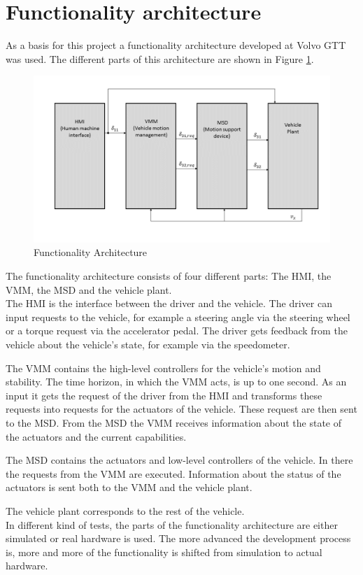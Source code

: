 \documentclass[ExampleMasters.tex]{subfiles}
\begin{document}
\section{Functionality architecture}
\label{sec:func_architecture}

As a basis for this project a functionality architecture developed at Volvo GTT was used. The different parts of this architecture are shown in Figure \ref{fig:funct_architecture}.

\begin{figure}[!htb]
	\centering
	\includegraphics[width=1\linewidth]{figures/functionality_architecture}
	
	\caption{Functionality Architecture}
	\label{fig:funct_architecture}
\end{figure}

The functionality architecture consists of four different parts: The \gls{HMI}, the \gls{VMM}, the \gls{MSD} and the vehicle plant.\\
The \gls{HMI} is the interface between the driver and the vehicle. The driver can input requests to the vehicle, for example a steering angle via the steering wheel or a torque request via the accelerator pedal. The driver gets feedback from the vehicle about the vehicle's state, for example via the speedometer.

The \gls{VMM} contains the high-level controllers for the vehicle's motion and stability. The time horizon, in which the \gls{VMM} acts, is up to one second. As an input it gets the request of the driver from the \gls{HMI} and transforms these requests into requests for the actuators of the vehicle. These request are then sent to the \gls{MSD}. From the \gls{MSD} the \gls{VMM} receives information about the state of the actuators and the current capabilities.

The \gls{MSD} contains the actuators and low-level controllers of the vehicle. In there the requests from the \gls{VMM} are executed. Information about the status of the actuators is sent both to the \gls{VMM} and the vehicle plant.

The vehicle plant corresponds to the rest of the vehicle.
\\
In different kind of tests, the parts of the functionality architecture are either simulated or real hardware is used. The more advanced the development process is, more and more of the functionality is shifted from simulation to actual hardware.
\end{document}
